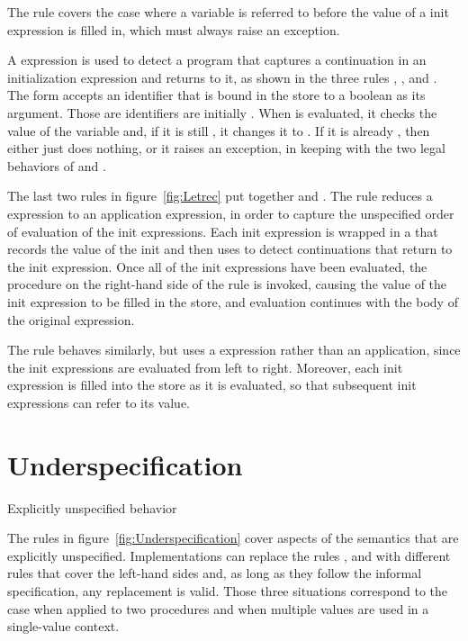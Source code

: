 The  rule covers the case where a variable is referred
to before the value of a init expression is filled in, which must
always raise an exception.

A  expression is used to detect a program that captures a continuation in an initialization expression and returns to it, as shown in the three rules , , and . The  form accepts an identifier that is bound in the store to a boolean as its argument. Those are identifiers are initially \semfalse{}. When  is evaluated, it checks the value of the variable and, if it is still \semfalse{}, it changes it to \semtrue{}. If it is already \semtrue{}, then  either just does nothing, or it raises an exception, in keeping with the two legal behaviors of  and .

The last two rules in figure~\ref{fig:Letrec} put together  and . The  rule reduces a  expression to an application expression, in order to capture the unspecified order of evaluation of the init expressions. Each init expression is wrapped in a  that records the value of the init and then uses  to detect continuations that return to the init expression. Once all of the init expressions have been evaluated, the procedure on the right-hand side of the rule is invoked, causing the value of the init expression to be filled in the store, and evaluation continues with the body of the original  expression.

The  rule behaves similarly, but uses a  expression rather than an application, since the init expressions are evaluated from left to right. Moreover, each init expression is filled into the store as it is evaluated, so that subsequent init expressions can refer to its value.

\section{Underspecification}\label{sec:semantics:underspecification}

\beginfig
\begin{center}

\end{center}
\caption{Explicitly unspecified behavior}\label{fig:Underspecification}
\endfig

The rules in figure~\ref{fig:Underspecification} cover aspects of the
semantics that are explicitly unspecified. Implementations can replace
the rules ,  and with different rules that cover the left-hand sides and, as long as they follow the informal specification, any replacement is valid. Those three situations correspond to the case when  applied to two procedures and when multiple values are used in a single-value context.

